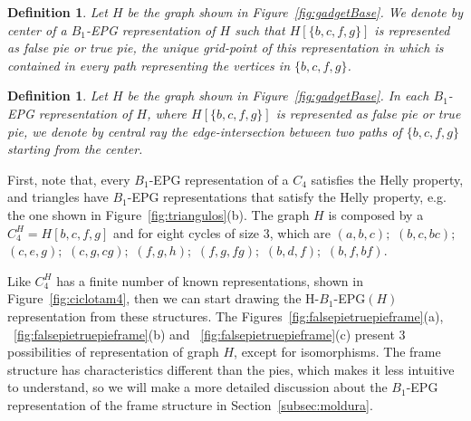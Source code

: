 \documentclass[a4paper,11pt]{article}
\newtheorem{defi}[theorem]{Definition}
\begin{document}
 


\begin{defi}
\label{lab:lab1}
Let $H$ be the graph shown in Figure~\ref{fig:gadgetBase}. We denote by \emph{center} of a $B_1$-EPG representation of $H$ such that $H[\{b, c, f, g \}]$ is represented as false pie or true pie, the unique grid-point of this representation in which is contained in every path representing the vertices in $ \{b, c, f, g \}$.
\end{defi}

\begin{defi}\citep{golumbic2009}
Let $H$ be the graph shown in Figure~\ref{fig:gadgetBase}. In each $B_1$-EPG representation of $H$, where $H[\{b, c, f, g \}]$ is represented as false pie or true pie, we denote by \emph {central ray} the edge-intersection  between two paths of $ \{b, c, f, g \} $ starting from the center.
\end{defi}

First, note that, every $B_1$-EPG representation of a $C_4$ satisfies the Helly property, and triangles have $B_1$-EPG representations that satisfy the Helly property, e.g. the one shown in Figure~\ref{fig:triangulos}(b). The graph $H$ is composed by a $C_4^H=H[b, c, f, g]$ and for eight cycles of size 3, which are $(a,b,c);$ $(b,c,bc);$ $(c,e,g);$ $(c,g,cg);$ $(f,g,h);$ $(f,g,fg);$ $(b,d,f);$ $(b,f,bf).$

Like $C_4^H$ has a finite number of known representations, shown in Figure~\ref{fig:ciclotam4}, then we can start drawing the H-$B_1$-EPG$(H) $ representation from these structures. The Figures~\ref{fig:falsepietruepieframe}(a), ~\ref{fig:falsepietruepieframe}(b) and ~\ref{fig:falsepietruepieframe}(c) present 3 possibilities of representation of graph $H$, except for isomorphisms. The frame structure has characteristics different than the pies, which makes it less intuitive to understand, so we will make a more detailed discussion about the $B_1$-EPG representation of the frame structure in Section~\ref{subsec:moldura}.
\end{document}
